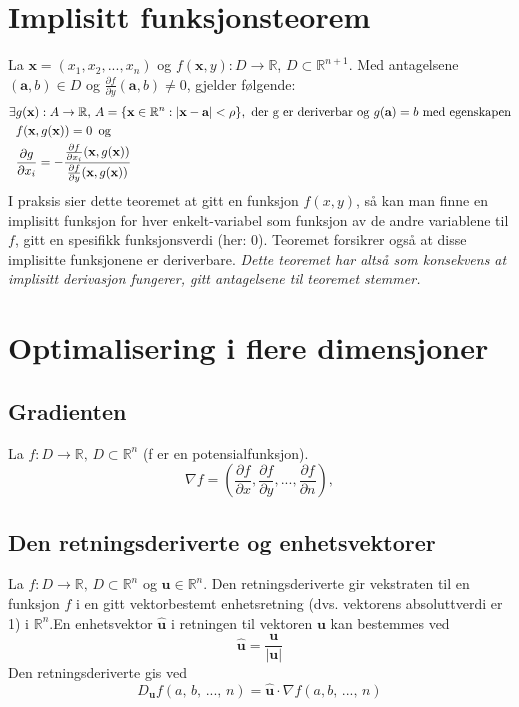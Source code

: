 \documentclass[fleqn,12pt]{wlscirep}
\begin{document}
\section{Implisitt funksjonsteorem}
La $\textbf{x} = (x_1,x_2,...,x_n)$ og $f(\textbf{x},y) : D  \to \mathbb{R}$, $ D \subset  \mathbb{R}^{n+1}$. Med antagelsene $(\textbf{a},b)\in D $ og $\frac{\partial f}{\partial y}(\textbf{a},b) \neq 0$, gjelder følgende:
\begin{align}
    \exists &g(\textbf{x}): A \to \mathbb{R},\, A =\{\textbf{x} \in \mathbb{R}^n :|\textbf{x}-\textbf{a}| < \rho \}, \text{ der g er deriverbar og  } g(\textbf{a}) = b \text{ med egenskapen}\notag\\
    &f(\textbf{x},g(\textbf{x})) = 0 \, \text{ og }\\  &\frac{\partial g}{\partial x_i} = -\frac{\frac{\partial f}{\partial x_i}(\textbf{x},g(\textbf{x}))}{\frac{\partial f}{\partial y}(\textbf{x},g(\textbf{x}))}
\end{align}
I praksis sier dette teoremet at gitt en funksjon $f(x,y)$, så kan man finne en implisitt funksjon for hver enkelt-variabel som funksjon av de andre variablene til $f$, gitt en spesifikk funksjonsverdi (her: 0).
Teoremet forsikrer også at disse implisitte funksjonene er deriverbare. \textit{Dette teoremet har altså som konsekvens at implisitt derivasjon fungerer, gitt antagelsene til teoremet stemmer.}
\section{Optimalisering i flere dimensjoner}
\subsection{Gradienten}
La $f: D \to \mathbb{R}, \, D \subset \mathbb{R}^n$ (f er en potensialfunksjon). 
\begin{equation}
 \nabla f = \left(\frac{\partial f}{\partial x},\frac{\partial f}{\partial y},...,\frac{\partial f}{\partial n}\right),
\end{equation}
\subsection{Den retningsderiverte og enhetsvektorer}
La $f : D \to \mathbb{R}, \, D \subset \mathbb{R}^n$ og $\textbf{u} \in \mathbb{R}^n$. Den retningsderiverte gir vekstraten til en funksjon $f$ i en gitt vektorbestemt enhetsretning (dvs. vektorens absoluttverdi er 1) i $\mathbb{R}^n$.\newline En enhetsvektor $\hat{\textbf{u}}$ i retningen til vektoren $\textbf{u}$ kan bestemmes ved 
\begin{equation}
    \hat{\textbf{u}} = \frac{\textbf{u}}{|\textbf{u}|}
\end{equation}
Den retningsderiverte gis ved 
\begin{equation}
    D_{\textbf{u}}f(a,\,b,\,...,\,n) = \hat{\textbf{u}}\cdot \nabla f(a,b,\,...,\,n)
\end{equation}
\end{document}
